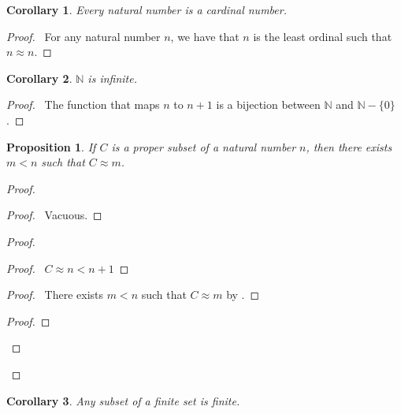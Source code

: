 \documentclass{book}
\let\qed\relax
\newtheorem{prop}[ax]{Proposition}
\newtheorem{cor}{Corollary}[ax]
\theoremstyle{definition}
\begin{document}
\begin{cor}
Every natural number is a cardinal number.
\end{cor}

\begin{proof}
\pf\ For any natural number $n$, we have that $n$ is the least ordinal such that $n \approx n$. \qed
\end{proof}

\begin{cor}
$\mathbb{N}$ is infinite.
\end{cor}

\begin{proof}
\pf\ The function that maps $n$ to $n+1$ is a bijection between $\mathbb{N}$ and $\mathbb{N} - \{0\}$. \qed
\end{proof}

\begin{prop}
If $C$ is a proper subset of a natural number $n$, then there exists $m < n$ such that $C \approx m$.
\end{prop}

\begin{proof}
\pf
{}
\begin{proof}
	\pf\ Vacuous.
\end{proof}
\begin{proof}
	\begin{proof}
		\pf\ $C \approx n < n+1$
	\end{proof}
	\begin{proof}
		\pf\ There exists $m < n$ such that $C \approx m$ by .
	\end{proof}
	\begin{proof}
	\end{proof}
\end{proof}
\qed
\end{proof}

\begin{cor}
Any subset of a finite set is finite.
\end{cor}
\end{document}
